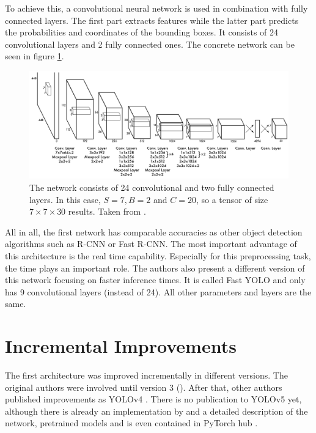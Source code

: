 To achieve this, a convolutional neural network is used in combination with fully connected layers. The first part extracts features while the latter part predicts the probabilities and coordinates of the bounding boxes. It consists of 24 convolutional layers and 2 fully connected ones. The concrete network can be seen in figure \ref{fig:YOLO_network}. \\


\begin{figure}[htb!]
	\centering
	\includegraphics[scale=0.25]{figures/YOLO_network.png}
	\caption{The network consists of 24 convolutional and two fully connected layers. In this case, $ S = 7, B = 2$ and $ C = 20 $, so a tensor of size $ 7 \times 7 \times 30 $ results. Taken from \cite{yolov1}.}
	\label{fig:YOLO_network}
\end{figure}

All in all, the first network has comparable accuracies as other object detection algorithms such as R-CNN or Fast R-CNN. The most important advantage of this architecture is the real time capability. Especially for this preprocessing task, the time plays an important role. The authors also present a different version of this network focusing on faster inference times. It is called Fast YOLO and only has 9 convolutional layers (instead of 24). All other parameters and layers are the same.

\section{Incremental Improvements}

The first architecture was improved incrementally in different versions. The original authors were involved until version 3 (\cite{yolov1, yolov2, yolov3}). After that, other authors published improvements as YOLOv4 \cite{yolov4}. There is no publication to YOLOv5 yet, although there is already an implementation by \cite{yolov5} and a detailed description of the network, pretrained models and is even contained in PyTorch hub \cite{pytorch_hub_yolov5}. \\

